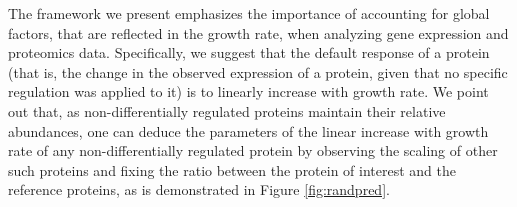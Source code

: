 The framework we present emphasizes the importance of accounting for global factors, that are reflected in the growth rate, when analyzing gene expression and proteomics data.
Specifically, we suggest that the default response of a protein (that is, the change in the observed expression of a protein, given that no specific regulation was applied to it) is to linearly increase with growth rate.
We point out that, as non-differentially regulated proteins maintain their relative abundances, one can deduce the parameters of the linear increase with growth rate of any non-differentially regulated protein by observing the scaling of other such proteins and fixing the ratio between the protein of interest and the reference proteins, as is demonstrated in Figure \ref{fig:randpred}.
